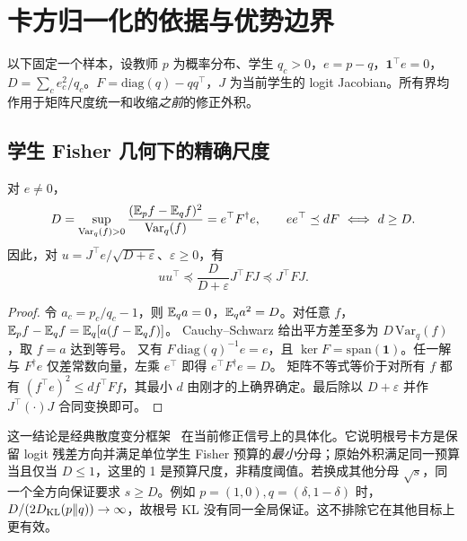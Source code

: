 \newpage
\section{卡方归一化的依据与优势边界}
\label{app:normalization}

以下固定一个样本，设教师 $p$ 为概率分布、学生 $q_c>0$，$e=p-q$，$\mathbf1^\top e=0$，$D=\sum_c e_c^2/q_c$。$F=\mathrm{diag}(q)-qq^\top$，$J$ 为当前学生的 logit Jacobian。所有界均作用于矩阵尺度统一和收缩\emph{之前}的修正外积。

\subsection{学生 Fisher 几何下的精确尺度}
\begin{proposition}
\label{prop:fisher}
对 $e\ne0$，
\begin{equation}
 D=\sup_{\mathrm{Var}_q(f)>0}
 \frac{(\mathbb E_p f-\mathbb E_q f)^2}{\mathrm{Var}_q(f)}
 =e^\top F^\dagger e,\qquad
 ee^\top\preceq dF\ \Longleftrightarrow\ d\ge D.
 \label{eq:sharp}
\end{equation}
因此，对 $u=J^\top e/\sqrt{D+\varepsilon}$、$\varepsilon\ge0$，有
\begin{equation}
 uu^\top\preceq\frac{D}{D+\varepsilon}J^\top FJ\preceq J^\top FJ.
\end{equation}
\end{proposition}
\begin{proof}
令 $a_c=p_c/q_c-1$，则 $\mathbb E_q a=0$，$\mathbb E_q a^2=D$。对任意 $f$，
$\mathbb E_p f-\mathbb E_q f=\mathbb E_q[a(f-\mathbb E_q f)]$。
Cauchy--Schwarz 给出平方差至多为 $D\,\mathrm{Var}_q(f)$，取 $f=a$ 达到等号。
又有 $F\,\mathrm{diag}(q)^{-1}e=e$，且 $\ker F=\mathrm{span}(\mathbf1)$。任一解与 $F^\dagger e$ 仅差常数向量，左乘 $e^\top$ 即得 $e^\top F^\dagger e=D$。
矩阵不等式等价于对所有 $f$ 都有 $(f^\top e)^2\le d f^\top Ff$，其最小 $d$ 由刚才的上确界确定。最后除以 $D+\varepsilon$ 并作 $J^\top(\cdot)J$ 合同变换即可。
\end{proof}

这一结论是经典散度变分框架~\citep{nguyen2010divergence} 在当前修正信号上的具体化。它说明根号卡方是保留 logit 残差方向并满足单位学生 Fisher 预算的\emph{最小}分母；原始外积满足同一预算当且仅当 $D\le1$，这里的 1 是预算尺度，非精度阈值。若换成其他分母 $\sqrt{s}$，同一个全方向保证要求 $s\ge D$。例如 $p=(1,0),q=(\delta,1-\delta)$ 时，$D/(2D_{\mathrm{KL}}(p\Vert q))\to\infty$，故根号 KL 没有同一全局保证。这不排除它在其他目标上更有效。

